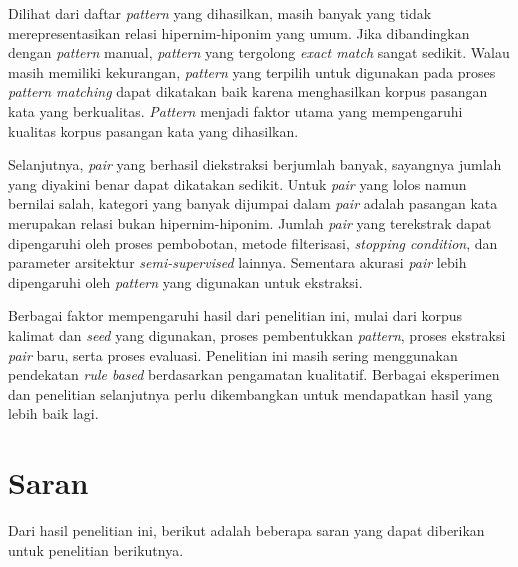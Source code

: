 Dilihat dari daftar \textit{pattern} yang dihasilkan, masih banyak yang tidak merepresentasikan relasi hipernim-hiponim yang umum. Jika dibandingkan dengan \textit{pattern} manual, \textit{pattern} yang tergolong \textit{exact match} sangat sedikit. Walau masih memiliki kekurangan, \textit{pattern} yang terpilih untuk digunakan pada proses \textit{pattern matching} dapat dikatakan baik karena menghasilkan korpus pasangan kata yang berkualitas. \textit{Pattern} menjadi faktor utama yang mempengaruhi kualitas korpus pasangan kata yang dihasilkan.

Selanjutnya, \textit{pair} yang berhasil diekstraksi berjumlah banyak, sayangnya jumlah yang diyakini benar dapat dikatakan sedikit. Untuk \textit{pair} yang lolos namun bernilai salah, kategori yang banyak dijumpai dalam \textit{pair} adalah pasangan kata merupakan relasi bukan hipernim-hiponim. Jumlah \textit{pair} yang terekstrak dapat dipengaruhi oleh proses pembobotan, metode filterisasi, \textit{stopping condition}, dan parameter arsitektur \textit{semi-supervised} lainnya. Sementara akurasi \textit{pair} lebih dipengaruhi oleh \textit{pattern} yang digunakan untuk ekstraksi. 

Berbagai faktor mempengaruhi hasil dari penelitian ini, mulai dari korpus kalimat dan \textit{seed} yang digunakan, proses pembentukkan \textit{pattern}, proses ekstraksi \textit{pair} baru, serta proses evaluasi. Penelitian ini masih sering menggunakan pendekatan \textit{rule based} berdasarkan pengamatan kualitatif. Berbagai eksperimen dan penelitian selanjutnya perlu dikembangkan untuk mendapatkan hasil yang lebih baik lagi.

\section{Saran}
Dari hasil penelitian ini, berikut adalah beberapa saran yang dapat diberikan untuk penelitian berikutnya.

